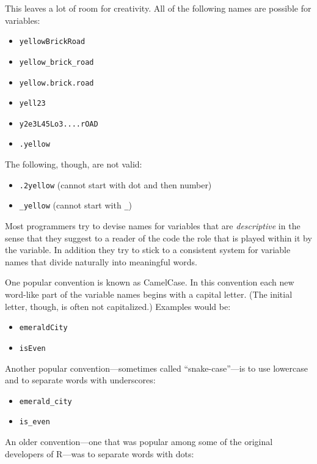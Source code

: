 \documentclass[]{book}
\providecommand{\tightlist}{%
  \setlength{\itemsep}{0pt}\setlength{\parskip}{0pt}}
\theoremstyle{definition}
\theoremstyle{definition}
\theoremstyle{remark}
\begin{document}
{This leaves a lot of room for creativity. All of the following names are
possible for variables:

\begin{itemize}
\tightlist
\item
  \texttt{yellowBrickRoad}
\item
  \texttt{yellow\_brick\_road}
\item
  \texttt{yellow.brick.road}
\item
  \texttt{yell23}
\item
  \texttt{y2e3L45Lo3....rOAD}
\item
  \texttt{.yellow}
\end{itemize}

The following, though, are not valid:

\begin{itemize}
\tightlist
\item
  \texttt{.2yellow} (cannot start with dot and then number)
\item
  \texttt{\_yellow} (cannot start with \texttt{\_})
\end{itemize}

Most programmers try to devise names for variables that are
\emph{descriptive} in the sense that they suggest to a reader of the
code the role that is played within it by the variable. In addition they
try to stick to a consistent system for variable names that divide
naturally into meaningful words.

One popular convention is known as CamelCase. In this
convention each new word-like part of the variable names begins with a
capital letter. (The initial letter, though, is often not capitalized.)
Examples would be:

\begin{itemize}
\tightlist
\item
  \texttt{emeraldCity}
\item
  \texttt{isEven}
\end{itemize}

Another popular convention---sometimes called ``snake-case''---is to use
lowercase and to separate words with underscores:

\begin{itemize}
\tightlist
\item
  \texttt{emerald\_city}
\item
  \texttt{is\_even}
\end{itemize}

An older convention---one that was popular among some of the original
developers of R---was to separate words with dots:

}
\end{document}
